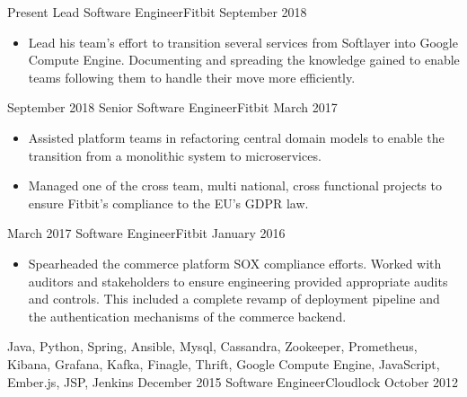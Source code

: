 %
%
%
\begin{experiences}
  \experience
  {Present}  {Lead Software Engineer}{Fitbit}
  {September 2018}   {
                      \begin{itemize}
                        \item Lead his team’s effort to transition several services from Softlayer into Google Compute Engine. Documenting and spreading the knowledge gained to enable teams following them to handle their move more efficiently.
                      \end{itemize}
                  }
                  {}
  \experience
  {September 2018}  {Senior Software Engineer}{Fitbit}
  {March 2017}   {
                      \begin{itemize}
                        \item Assisted platform teams in refactoring central domain models to enable the transition from a monolithic system to microservices.
                        \item Managed one of the cross team, multi national, cross functional projects to ensure Fitbit’s compliance to the EU’s GDPR law.
                      \end{itemize}
                  }
                  {}
   \experience
  {March 2017}  {Software Engineer}{Fitbit}
  {January 2016}   {
                      \begin{itemize}
                        \item Spearheaded the commerce platform SOX compliance efforts. Worked with auditors and stakeholders to ensure engineering provided appropriate audits and controls. This included a complete revamp of deployment pipeline and the authentication mechanisms of the commerce backend.
                      \end{itemize}
                  }
                  {Java, Python, Spring, Ansible, Mysql, Cassandra, Zookeeper, Prometheus, Kibana, Grafana, Kafka, Finagle, Thrift, Google Compute Engine, JavaScript, Ember.js, JSP, Jenkins}
\emptySeparator
  \experience
  {December 2015}  {Software Engineer}{Cloudlock}
  {October 2012}   {
                      \begin{itemize}

\end{itemize}}
\end{experiences}
